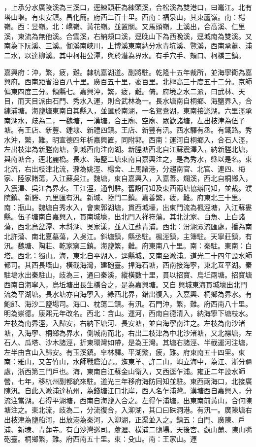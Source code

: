 \begin{pinyinscope}
，上承分水廣陵溪為三溪口，逕練頭莊為練頭溪，合松溪為雙港口，曰鼉江。北有塔山堰。有東安鎮。昌化簡。府西二百十里。西南：福泉山，其東蘆嶺。南：楊嶺。西：昱嶺。北：嶠嶺、黃花嶺。並置關。又馬頭嶺，上溪出，合高溪、仁里溪，東流為無他溪。合雲溪，右納頰口溪，逕晚山下為西晚溪，逕城南為雙溪。又南為下阮溪、三溪。伽溪南峽川，上博溪東南納分水青坑溪、覽溪，西南承蕭、浦二水，以達柳溪。其中柯相公潭，與於潛為界水。有手穴手、頰口、柯橋三鎮。

嘉興府：沖，繁，疲，難。隸杭嘉湖道。副將駐。乾隆十五年裁所，並海寧衛為嘉興府。西南距省治百八十里。廣百五十里，袤百里。北極高三十度五十二分。京師偏東四度三分。領縣七。嘉興沖，繁，疲，難。倚。府境之水二派，曰武林、天目，而天目派由石門、秀水入運，則合武林為一。長水塘南自桐鄉、海鹽界入，合練浦塘。海鹽塘東南自其縣入，並匯於南湖，一名鴛鴦湖，東南接滮湖。六里涇承南湖水，歧為二，一魏塘，一漢塘。合王廟、空廟、眾歡諸塘，左出枝津為伍子塘。有王店、新豐、鍾埭、新禮四鎮。王店、新豐有汛。西水驛有丞。有鐵路。秀水沖，繁，難。明宣德四年析嘉興置，同附郭。西南：運河自桐鄉入，合石人涇，左出枝津為新塍南塘，側城西南注南湖。新塍塘西北自江蘇震澤入，納新塍北塘，與南塘合，逕北麗橋。長水、海鹽二塘東南自嘉興注之，是為秀水，縣以是名。東北流，右出枝津北流，瀦為姚涇、楊舍、上馬諸港，分趨南官、北官、連四、梅家、陸家諸蕩，入江蘇吳江。魏塘，東自嘉興入，入嘉善。爛溪，西北自桐鄉入，入震澤、吳江為界水。王江涇，通判駐。舊設同知及東西兩塘協辦同知，並裁。濮院鎮、新塍、九里匯有汛。新城、陸門二鎮。嘉善繁，疲，難。府東北三十里。南：瓶山。魏塘自秀水入，會東郭湖塘，貫西城壕，出東門流為楓涇塘，入江蘇婁縣。伍子塘南自嘉興入，貫南城壕，出北門入祥符蕩。其北沈家、白魚、上白諸蕩，西北烏盆潭、木斜湖、吳家漾，並入江蘇青浦。西北：汾湖潀流匯處，播為南北許蕩、南北夏墓蕩，入吳江。斜塘鎮，縣丞駐。楓涇鎮，主簿駐。天寧莊鎮，有汛。魏塘、陶莊、乾家窯三鎮。海鹽繁，難。府東南八十里。南：秦駐。東南：白塔。西北：獨山。海，東北自平湖入，逕縣城，又南至澉浦。道光二十四年設水師都司。其西長墻山，橫截海灣，建砲臺。捍海石塘，西南接海寧，東北亙平湖。秦駐塢水出秦駐山，歧為三，通曰秦溪，縱橫數十里，貫以招寶、烏坵兩塘。招寶塘西南自海寧入，烏坵塘出長生橋合之，是為嘉興塘。又自興城東海貫城壕出北門流為平湖塘。長水塘亦自海寧入，緣西北界，錯出復入，入嘉興、桐鄉為界水。有鮑郎、海沙二鹽場司。海口、枕蕩二鎮。有汛。石門沖，繁，難。府西南八十里。明為崇德。康熙元年改名。西北：含山。運河，西南自德清入，納海寧下塘枝水。左枝為南界涇，入歸安，右納下塘河、長安塘，並自海寧南注之。左枝為南沙渚塘，入海寧、桐鄉為界水，側城南而北，右出二枝津為中北沙渚塘，又北襟塘，左石人、瓜塔、沙木諸涇，折東環灣如帶，是為王灣。其塘右諸涇、半截運河注塘，左半由含山入歸安。有玉溪鎮。皁林驛。平湖繁，疲，難。府東南五十四里。東南：雅山，又苦竹山，水師戰艦泊焉。迤東羊、許二山，峭立海中，為江、浙分疆處，浙西第三門戶也。海，東南自江蘇金山衛入，又西逕乍浦。雍正二年設水師營，七年，移杭州副都統來駐。道光三年移府海防同知並駐。東西兩海口，北接廣陳汛。自此入澉浦達杭州，為錢塘江口北岸，西人名乍浦灣。漢塘西自嘉興入，分流注當湖。右得平湖塘，西南自海鹽入合之。左得乍浦塘，出東南前黃山，合何陳塘注之。東北流，歧為二，分流復合，入泖湖，其口曰硃洞港。有汛一。廣陳塘右出枝津為鹽船河，出放港為秦河，入泖湖，正渠並入之。鎮五：白門、廣陳、戶浦、新埭、青蓮寺。有白沙灣巡司。蘆瀝、橫浦二鹽場。天後宮、觀山麓、陳山嘴砲臺。桐鄉繁，難。府西南五十里。東：殳山。南：王家山。運
\end{pinyinscope}
